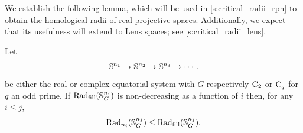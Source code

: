 \subsubsection{}\label{ss:fundamental_lemma}

We establish the following lemma, which will be used in \cref{s:critical_radii_rpn} to obtain the homological radii of real projective spaces.
Additionally, we expect that its usefulness will extend to Lens spaces; see \cref{s:critical_radii_lens}.

\lemma Let
\[
\mathbb{S}^{n_1} \to \mathbb{S}^{n_2} \to \mathbb{S}^{n_3} \to \dotsb .
\]
be either the real or complex equatorial system with \(G\) respectively \(\mathrm{C}_2\) or \(\mathrm{C}_q\) for \(q\) an odd prime.
If $\mathrm{Rad}_{\mathrm{fill}}(\mathbb{S}^{n_i}_G)$ is non-decreasing as a function of \(i\) then, for any \(i \leq j\),
\[
\mathrm{Rad}_{n_i}(\mathbb{S}^{n_j}_G) \leq \mathrm{Rad}_{\mathrm{fill}}(\mathbb{S}^{n_j}_G).
\]

